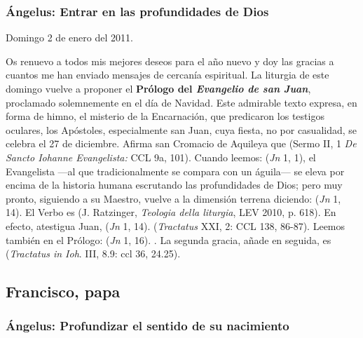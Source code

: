 \subsubsection{Ángelus: Entrar en las profundidades de Dios}

Domingo 2 de enero del 2011.

Os renuevo a todos mis mejores deseos para el año nuevo y doy las gracias a cuantos me han enviado mensajes de cercanía espiritual. La liturgia de este domingo vuelve a proponer el \textbf{Prólogo del \emph{Evangelio de san Juan}}, proclamado solemnemente en el día de Navidad. Este admirable texto expresa, en forma de himno, el misterio de la Encarnación, que predicaron los testigos oculares, los Apóstoles, especialmente san Juan, cuya fiesta, no por casualidad, se celebra el 27 de diciembre. Afirma san Cromacio de Aquileya que  (Sermo II, 1 \emph{De Sancto Iohanne Evangelista:} CCL 9a, 101). Cuando leemos:  (\emph{Jn} 1, 1), el Evangelista ---al que tradicionalmente se compara con un águila--- se eleva por encima de la historia humana escrutando las profundidades de Dios; pero muy pronto, siguiendo a su Maestro, vuelve a la dimensión terrena diciendo:  (\emph{Jn} 1, 14). El Verbo es  (J. Ratzinger, \emph{Teologia della liturgia}, LEV 2010, p. 618). En efecto, atestigua Juan,  (\emph{Jn} 1, 14).  (\emph{Tractatus} XXI, 2: CCL 138, 86-87). Leemos también en el Prólogo:  (\emph{Jn} 1, 16). . La segunda gracia, añade en seguida, es  (\emph{Tractatus in Ioh}. III, 8.9: ccl 36, 24.25).

\subsection{Francisco, papa}

\subsubsection{Ángelus: Profundizar el sentido de su nacimiento}

